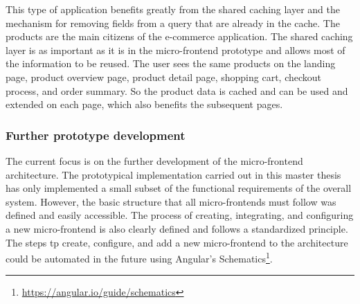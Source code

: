\bigskip

\noindent This type of application benefits greatly from the shared caching layer and the mechanism for removing fields from a query that are already in the cache. The products are the main citizens of the e-commerce application. The shared caching layer is as important as it is in the micro-frontend prototype and allows most of the information to be reused. The user sees the same products on the landing page, product overview page, product detail page, shopping cart, checkout process, and order summary. So the product data is cached and can be used and extended on each page, which also benefits the subsequent pages.

\subsubsection{Further prototype development}

The current focus is on the further development of the micro-frontend architecture. The prototypical implementation carried out in this master thesis has only implemented a small subset of the functional requirements of the overall system. However, the basic structure that all micro-frontends must follow was defined and easily accessible. The process of creating, integrating, and configuring a new micro-frontend is also clearly defined and follows a standardized principle. The steps tp create, configure, and add a new micro-frontend to the architecture could be automated in the future using Angular's Schematics\footnote{\url{https://angular.io/guide/schematics}}.
